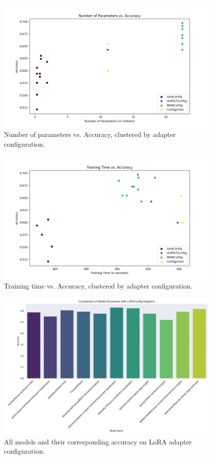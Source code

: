 \documentclass[conference]{IEEEtran}
\begin{document}
\begin{figure}[!h]
    \centering
    \includegraphics[width=.85\linewidth]{pictures/number_params_vs_accuracy.png}
    \caption{Number of parameters vs. Accuracy, clustered by adapter configuration.}
    \label{fig:param_acc}
\end{figure}

\begin{figure}[!h]
    \centering
    \includegraphics[width=.85\linewidth]{pictures/training_time_vs_accuracy.png}
    \caption{Training time vs. Accuracy,  clustered by adapter configuration.}
    \label{fig:time_acc}
\end{figure}

\begin{figure}[!h]
    \centering
    \includegraphics[width=.85\linewidth]{pictures/accuracy_lora.png}
    \caption{All models and their corresponding accuracy on LoRA adapter configuration.}
    \label{fig:models_lora_acc}
\end{figure}
\end{document}
